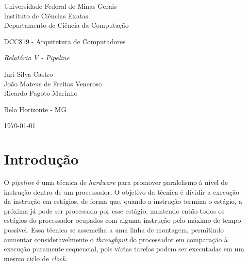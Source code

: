 \documentclass[11pt,a4paper,titlepage]{article}
\newcommand{\titulo}{\textit{Relatório V - Pipeline}}
\begin{document}
\begin{titlepage}
\begin{center}

\begin{large}
Universidade Federal de Minas Gerais\\
Instituto de Ciências Exatas\\
Departamento de Ciência da Computação\\
\end{large}

\vspace{20mm}

\begin{Large}
DCC819 - Arquitetura de Computadores
\end{Large}

\vspace{20mm}

\begin{LARGE}
\titulo
\end{LARGE}


\vspace{30mm}

\begin{Large}
\begin{center}
Iuri Silva Castro\\ João Mateus de Freitas Veneroso\\ Ricardo Pagoto Marinho \\
\end{center}
\end{Large}


\vspace{60mm}

{\sc Belo Horizonte - MG}

{\sc \today}

\end{center}
\end{titlepage}

\section{Introdução}\label{sec:desc}

O \textit{pipeline} é uma técnica de \textit{hardware} para promover paralelismo à nível de instrução dentro de um processador. O objetivo da técnica é dividir a execução da instrução em estágios, de forma que, quando a instrução termina o estágio, a próxima já pode ser processada por esse estágio, mantendo então todos os estágios do processador ocupados com alguma instrução pelo máximo de tempo possível. Essa técnica se assemelha a uma linha de montagem, permitindo aumentar consideravelmente o \textit{throughput} do processador em comparação à execução puramente sequencial, pois várias tarefas podem ser executadas em um mesmo ciclo de \textit{clock}.
\end{document}
